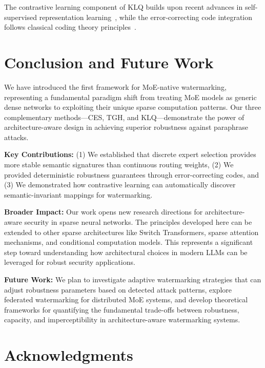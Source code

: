 The contrastive learning component of KLQ builds upon recent advances in self-supervised representation learning~\cite{chen2020simple}, while the error-correcting code integration follows classical coding theory principles~\cite{macwilliams1977theory}.

\section{Conclusion and Future Work}

We have introduced the first framework for MoE-native watermarking, representing a fundamental paradigm shift from treating MoE models as generic dense networks to exploiting their unique sparse computation patterns. Our three complementary methods—CES, TGH, and KLQ—demonstrate the power of architecture-aware design in achieving superior robustness against paraphrase attacks.

\textbf{Key Contributions:} (1) We established that discrete expert selection provides more stable semantic signatures than continuous routing weights, (2) We provided deterministic robustness guarantees through error-correcting codes, and (3) We demonstrated how contrastive learning can automatically discover semantic-invariant mappings for watermarking.

\textbf{Broader Impact:} Our work opens new research directions for architecture-aware security in sparse neural networks. The principles developed here can be extended to other sparse architectures like Switch Transformers, sparse attention mechanisms, and conditional computation models. This represents a significant step toward understanding how architectural choices in modern LLMs can be leveraged for robust security applications.

\textbf{Future Work:} We plan to investigate adaptive watermarking strategies that can adjust robustness parameters based on detected attack patterns, explore federated watermarking for distributed MoE systems, and develop theoretical frameworks for quantifying the fundamental trade-offs between robustness, capacity, and imperceptibility in architecture-aware watermarking systems.

\section*{Acknowledgments}

